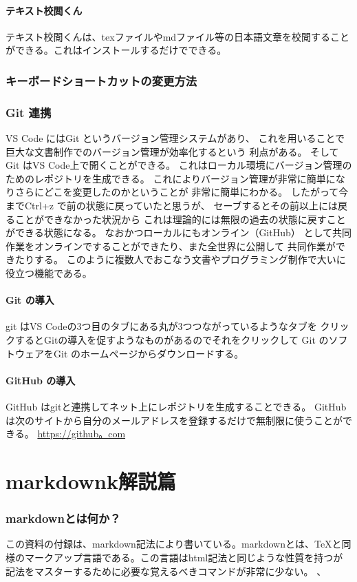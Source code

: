 \documentclass{ltjsarticle}
\begin{document}
\subsection{テキスト校閲くん}
テキスト校閲くんは、texファイルやmdファイル等の日本語文章を校閲することができる。これはインストールするだけでできる。

\section{キーボードショートカットの変更方法}

\section{Git 連携}
VS Code にはGit というバージョン管理システムがあり、
これを用いることで巨大な文書制作でのバージョン管理が効率化するという
利点がある。
そしてGit はVS Code上で開くことができる。
これはローカル環境にバージョン管理のためのレポジトリを生成できる。
これによりバージョン管理が非常に簡単になりさらにどこを変更したのかということが
非常に簡単にわかる。
したがって今までCtrl+z で前の状態に戻っていたと思うが、
セーブするとその前以上には戻ることができなかった状況から
これは理論的には無限の過去の状態に戻すことができる状態になる。
なおかつローカルにもオンライン（GitHub）
として共同作業をオンラインですることができたり、また全世界に公開して
共同作業ができたりする。
このように複数人でおこなう文書やプログラミング制作で大いに役立つ機能である。
\subsection{Git の導入}
git はVS Codeの3つ目のタブにある丸が3つつながっているようなタブを
クリックするとGitの導入を促すようなものがあるのでそれをクリックして
Git のソフトウェアをGit のホームページからダウンロードする。
\subsection{GitHub の導入}
GitHub はgitと連携してネット上にレポジトリを生成することできる。
GitHub は次のサイトから自分のメールアドレスを登録するだけで無制限に使うことができる。
\url{https://github。com}

\part{markdownk解説篇}
\section{markdownとは何か？}
この資料の付録は、markdown記法により書いている。markdownとは、TeXと同様のマークアップ言語である。この言語はhtml記法と同じような性質を持つが記法をマスターするために必要な覚えるべきコマンドが非常に少ない。
、
\end{document}
